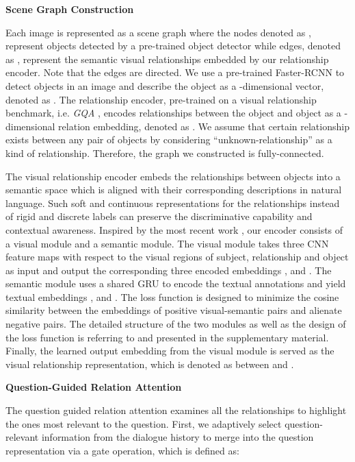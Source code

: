 \documentclass[letterpaper]{article} \usepackage{aaai20}  \usepackage{times}  \usepackage{helvet} \usepackage{courier}  \usepackage[hyphens]{url}  \usepackage{graphicx} \urlstyle{rm} \def\UrlFont{\rm}  \usepackage{graphicx}  \frenchspacing  \setlength{\pdfpagewidth}{8.5in}  \setlength{\pdfpageheight}{11in}  \usepackage{mathrsfs} \usepackage{amsfonts,amssymb}  \usepackage{tabularx} \usepackage{url}
\begin{document}
\textbf{Scene Graph Construction}

Each image is represented as a scene graph where the nodes denoted as , represent objects detected by a pre-trained object detector while edges, denoted as , represent the semantic visual relationships embedded by our relationship encoder. Note that the edges are directed. We use a pre-trained Faster-RCNN \cite{Ren2017Faster} to detect  objects in an image and describe the object  as a -dimensional vector, denoted as . The relationship encoder, pre-trained on a visual relationship benchmark, i.e. \textit{GQA} \cite{hudson2019GQA}, encodes relationships between the object  and object  as a -dimensional relation embedding, denoted as . We assume that certain relationship exists between any pair of objects by considering ``unknown-relationship'' as a kind of relationship. Therefore, the graph we constructed is fully-connected.










The visual relationship encoder embeds the relationships between objects into a semantic space which is aligned with their corresponding descriptions in natural language. Such soft and continuous representations for the relationships instead of rigid and discrete labels can preserve the discriminative capability and contextual awareness. 
Inspired by the most recent work \cite{zhang2019large}, our encoder consists of a visual module and a semantic module. The visual module takes three CNN feature maps with respect to the visual regions of subject, relationship and object as input and output the corresponding three encoded embeddings ,  and . The semantic module uses a shared GRU to encode the textual annotations and yield textual embeddings ,  and . The loss function is designed to minimize the cosine similarity between the embeddings of positive visual-semantic pairs and alienate negative pairs. The detailed structure of the two modules as well as the design of the loss function is referring to \cite{zhang2019large} and presented in the supplementary material. Finally, the learned output embedding  from the visual module is served as the visual relationship representation, which is denoted as  between  and . 




\textbf{Question-Guided Relation Attention}

The question guided relation attention examines all the relationships to highlight the ones most relevant to the question. First, we adaptively select question-relevant information from the dialogue history to merge into the question representation via a gate operation, which is defined as:
\end{document}
